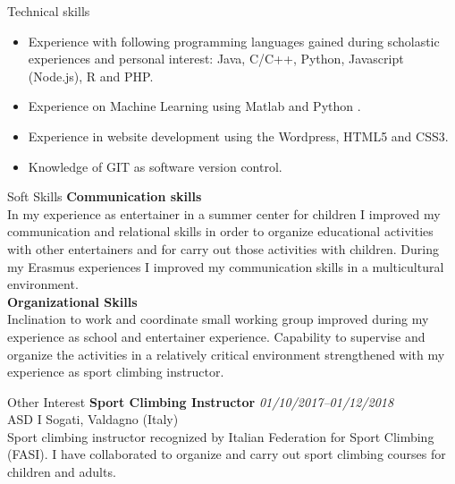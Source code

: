 \documentclass{resume} %
\begin{document}
\begin{rSection}{Technical skills}
    \begin{itemize}
        
        \item Experience with following programming languages gained during scholastic experiences and personal interest: Java, C/C++, Python, Javascript (Node.js), R and PHP.
        \item Experience on Machine Learning using Matlab and Python .
        \item Experience in website development using the Wordpress, HTML5 and CSS3.
        \item Knowledge of GIT as software version control.
    \end{itemize}    
\end{rSection}

\begin{rSection}{Soft Skills}
        {\bf Communication skills}\\
        In my experience as entertainer in a summer center for children I improved my communication and relational skills in order to organize educational activities with other entertainers and for carry out those activities with children.
        During my Erasmus experiences I improved my communication skills in a multicultural environment. \\
        {\bf Organizational Skills}\\
        Inclination to work and coordinate small working group improved during my experience as school and entertainer experience.
        Capability to supervise and organize the activities in a relatively critical environment strengthened with my experience as sport climbing instructor.
\end{rSection}

\begin{rSection}{Other Interest}
    {\bf Sport Climbing Instructor}
    \hfill {\em 01/10/2017–01/12/2018}\\
    ASD I Sogati, Valdagno (Italy) \\
    Sport climbing instructor recognized by Italian Federation for Sport Climbing (FASI). I have collaborated to organize and carry out sport climbing courses for children and adults.
\end{rSection}
\end{document}
